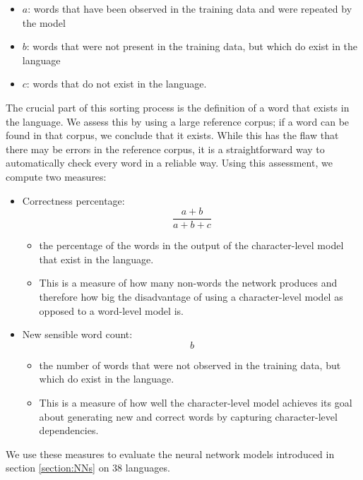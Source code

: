 \documentclass[11pt,a4paper,twoside,openright]{scrbook}
\begin{document}
\begin{itemize}
	\item $a$: words that have been observed in the training data and were repeated by the model 
	\item $b$: words that were not present in the training data, but which do exist in the language
	\item $c$: words that do not exist in the language. 
\end{itemize}

The crucial part of this sorting process is the definition of a word that exists in the language. We assess this by using a large reference corpus; if a word can be found in that corpus, we conclude that it exists. While this has the flaw that there may be errors in the reference corpus, it is a straightforward way to automatically check every word in a reliable way. Using this assessment, we compute two measures: 
	
\begin{itemize}
\item Correctness percentage: 
	\begin{equation}
	\frac{a + b}{a + b + c}
	\end{equation}
	\begin{itemize}
		\item the percentage of the words in the output of the character-level model that exist in the language. 
		\item This is a measure of how many non-words the network produces and therefore how big the disadvantage of using a character-level model as opposed to a word-level model is.
	\end{itemize}

\item New sensible word count:
	\begin{equation}
	b
	\end{equation}
	\begin{itemize}
		\item the number of words that were not observed in the training data, but which do exist in the language. 
		\item This is a measure of how well the character-level model achieves its goal about generating new and correct words by capturing character-level dependencies. 
	\end{itemize}

\end{itemize}

We use these measures to evaluate the neural network models introduced in section \ref{section:NNs} on 38 languages.
\end{document}
